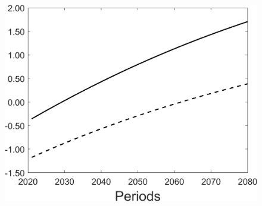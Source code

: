 \begin{figure}[h!!]
\begin{minipage}[]{0.32\textwidth}
\end{minipage}
\begin{minipage}[]{0.32\textwidth}
	\includegraphics[width=1\textwidth]{../../codding_model/Own/figures/Rep_agent/staticRam_LF_separate_welfare_periods59_eppsilon0.40_zeta1.40_Ad08_Ac04_thetac0.70_thetad0.56_HetGrowth1_tauul0.181_util0_withtarget0_lgd0.png}
\end{minipage}
\end{figure}

